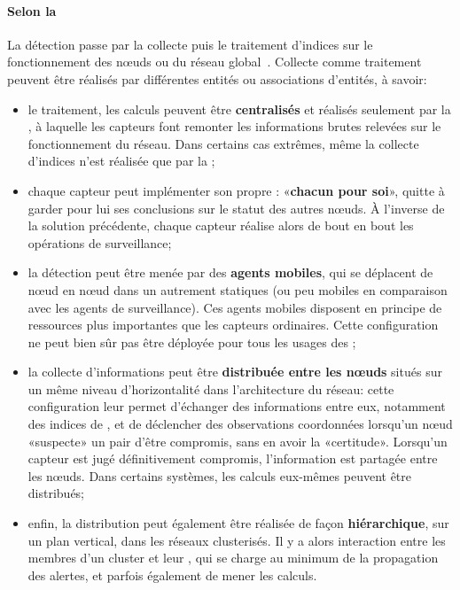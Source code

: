         \paragraph{Selon la }
La détection passe par la collecte puis le traitement d'indices sur le fonctionnement des nœuds ou du réseau global~\cite{BMS13}.
Collecte comme traitement peuvent être réalisés par différentes entités ou associations d'entités, à savoir:
\begin{itemize}
    \item le traitement, les calculs peuvent être \textbf{centralisés} et réalisés seulement par la \sdb, à laquelle les capteurs font remonter les informations brutes relevées sur le fonctionnement du réseau. Dans certains cas extrêmes, même la collecte d'indices n'est réalisée que par la \sdb;
    \item chaque capteur peut implémenter son propre \ids: «\textbf{chacun pour soi}», quitte à garder pour lui ses conclusions sur le statut des autres nœuds. À l'inverse de la solution précédente, chaque capteur réalise alors de bout en bout les opérations de surveillance;
    \item la détection peut être menée par des \textbf{agents mobiles}, qui se déplacent de nœud en nœud dans un \rc autrement statiques (ou peu mobiles en comparaison avec les agents de surveillance). Ces agents mobiles disposent en principe de ressources plus importantes que les capteurs ordinaires. Cette configuration ne peut bien sûr pas être déployée pour tous les usages des \rcs;
    \item la collecte d'informations peut être \textbf{distribuée entre les nœuds} situés sur un même niveau d'horizontalité dans l'architecture du réseau: cette configuration leur permet d'échanger des informations entre eux, notamment des indices de , et de déclencher des observations coordonnées lorsqu'un nœud «suspecte» un pair d'être compromis, sans en avoir la «certitude». Lorsqu'un capteur est jugé définitivement compromis, l'information est partagée entre les nœuds. Dans certains systèmes, les calculs eux-mêmes peuvent être distribués;
    \item enfin, la distribution peut également être réalisée de façon \textbf{hiérarchique}, sur un plan vertical, dans les réseaux clusterisés. Il y a alors interaction entre les membres d'un cluster et leur \ch, qui se charge au minimum de la propagation des alertes, et parfois également de mener les calculs.
\end{itemize}

